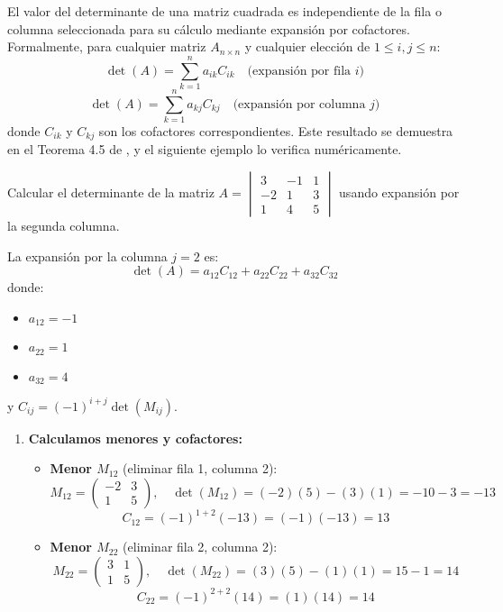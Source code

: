 \begin{theorem}
\label{rem:invariance-det}
El valor del determinante de una matriz cuadrada es independiente de la fila o columna seleccionada para su cálculo mediante expansión por cofactores. Formalmente, para cualquier matriz $A_{n\times n}$ y cualquier elección de $1 \leq i,j \leq n$:
\[
\det(A) = \sum_{k=1}^{n} a_{ik}C_{ik} \quad \text{(expansión por fila } i\text{)}
\]
\[
\det(A) = \sum_{k=1}^{n} a_{kj}C_{kj} \quad \text{(expansión por columna } j\text{)}
\]
donde $C_{ik}$ y $C_{kj}$ son los cofactores correspondientes. Este resultado se demuestra en el Teorema 4.5 de \cite{araujo2014algebra}, y el siguiente ejemplo lo verifica numéricamente.
\end{theorem}

\begin{example}
\label{ex:det-col2}
Calcular el determinante de la matriz \(
A = \begin{vmatrix}
3 & -1 & 1 \\
-2 & 1 & 3 \\
1 & 4 & 5
\end{vmatrix}
\) usando expansión por la segunda columna.

\begin{myproof}
La expansión por la columna $j=2$ es:
\[
\det(A) = a_{12}C_{12} + a_{22}C_{22} + a_{32}C_{32}
\]
donde:
\begin{itemize}
\item $a_{12} = -1$
\item $a_{22} = 1$
\item $a_{32} = 4$
\end{itemize}
y $C_{ij} = (-1)^{i+j}\det(M_{ij})$.

\begin{enumerate}
\item \textbf{Calculamos menores y cofactores:}
\begin{itemize}
\item \textbf{Menor $M_{12}$} (eliminar fila 1, columna 2):
\[
M_{12} = \begin{pmatrix}
-2 & 3 \\
1 & 5
\end{pmatrix}, \quad
\det(M_{12}) = (-2)(5) - (3)(1) = -10 - 3 = -13
\]
\[
C_{12} = (-1)^{1+2}(-13) = (-1)(-13) = 13
\]

\item \textbf{Menor $M_{22}$} (eliminar fila 2, columna 2):
\[
M_{22} = \begin{pmatrix}
3 & 1 \\
1 & 5
\end{pmatrix}, \quad
\det(M_{22}) = (3)(5) - (1)(1) = 15 - 1 = 14
\]
\[
C_{22} = (-1)^{2+2}(14) = (1)(14) = 14
\]


\end{itemize}
\end{enumerate}
\end{myproof}
\end{example}
